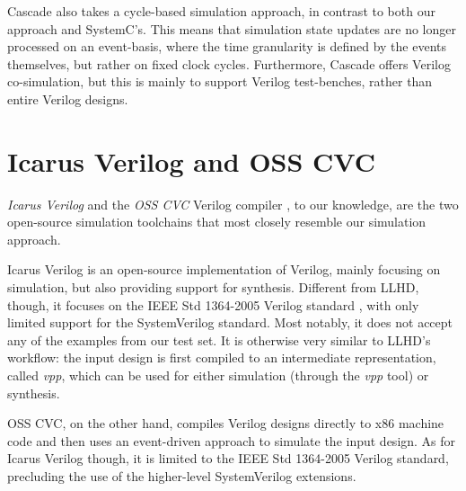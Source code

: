 Cascade also takes a cycle-based simulation approach, in contrast to both our approach and SystemC's. This means that simulation state updates are no longer processed on an event-basis, where the time granularity is defined by the events themselves, but rather on fixed clock cycles. Furthermore, Cascade offers Verilog co-simulation, but this is mainly to support Verilog test-benches, rather than entire Verilog designs.


\section{Icarus Verilog and OSS CVC}
\textit{Icarus Verilog} \cite{icarus} and the \textit{OSS CVC} Verilog compiler \cite{Meyer2016}, to our knowledge, are the two open-source simulation toolchains that most closely resemble our simulation approach.

Icarus Verilog is an open-source implementation of Verilog, mainly focusing on simulation, but also providing support for synthesis. Different from LLHD, though, it focuses on the IEEE Std 1364-2005 Verilog standard \cite{V2006}, with only limited support for the SystemVerilog standard. Most notably, it does not accept any of the examples from our test set. It is otherwise very similar to LLHD's workflow: the input design is first compiled to an intermediate representation, called \textit{vpp}, which can be used for either simulation (through the \textit{vpp} tool) or synthesis.

OSS CVC, on the other hand, compiles Verilog designs directly to x86 machine code and then uses an event-driven approach to simulate the input design. As for Icarus Verilog though, it is limited to the IEEE Std 1364-2005 Verilog standard, precluding the use of the higher-level SystemVerilog extensions.
